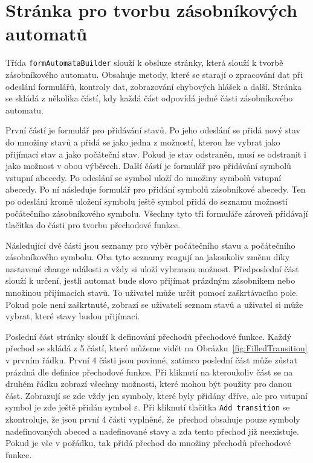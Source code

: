 \section{Stránka pro tvorbu zásobníkových automatů}\label{sec:PDABuilderImplementation}

Třída \texttt{formAutomataBuilder} slouží k obsluze stránky, která slouží k tvorbě zásobníkového automatu. Obsahuje metody, které se starají o zpracování dat při odeslání formulářů, kontroly dat, zobrazování chybových hlášek a další. Stránka se skládá z několika částí, kdy každá část odpovídá jedné části zásobníkového automatu. 

První částí je formulář pro přidávání stavů. Po jeho odeslání se přidá nový stav do množiny stavů a přidá se jako jedna z možností, kterou lze vybrat jako přijímací stav a jako počáteční stav. Pokud je stav odstraněn, musí se odstranit i jako možnost v obou výběrech. Další částí je formulář pro přidávání symbolů vstupní abecedy. Po odeslání se symbol uloží do množiny symbolů vstupní abecedy. Po ní následuje formulář pro přidání symbolů zásobníkové abecedy. Ten po odeslání kromě uložení symbolu ještě symbol přidá do seznamu možností počátečního zásobníkového symbolu. Všechny tyto tři formuláře zároveň přidávají tlačítka do části pro tvorbu přechodové funkce. 

Následující dvě části jsou seznamy pro výběr počátečního stavu a počátečního zásobníkového symbolu. Oba tyto seznamy reagují na jakoukoliv změnu díky nastavené change události a vždy si uloží vybranou možnost. Předposlední část slouží k určení, jestli automat bude slovo přijímat prázdným zásobníkem nebo množinou přijímacích stavů. To uživatel může určit pomocí zaškrtávacího pole. Pokud pole není zaškrtnuté, zobrazí se uživateli seznam stavů a uživatel si může vybrat, které stavy budou přijímací.

Poslední část stránky slouží k definování přechodů přechodové funkce. Každý přechod se skládá z 5 částí, které můžeme vidět na Obrázku~\ref{fig:FilledTransition} v prvním řádku. První 4 části jsou povinné, zatímco poslední část může zůstat prázdná dle definice přechodové funkce. Při kliknutí na kteroukoliv část se na druhém řádku zobrazí všechny možnosti, které mohou být použity pro danou část. Zobrazují se zde vždy jen symboly, které byly přidány dříve, ale pro vstupní symbol je zde ještě přidán symbol $\varepsilon$. Při kliknutí tlačítka \texttt{Add transition} se zkontroluje, že jsou první 4 části vyplněné, že~přechod obsahuje pouze symboly nadefinovaných abeced a nadefinované stavy a zda tento přechod již neexistuje. Pokud je vše v pořádku, tak přidá přechod do množiny přechodů přechodové funkce.

